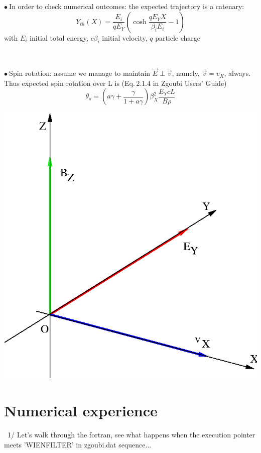 \documentclass[10pt]{article}
\newcommand{\nib}{\noindent \ensuremath{\bullet~}}
\newcommand{\nin}{\noindent~}
\begin{document}
\begin{minipage}{.69\linewidth}
\nib In order to check numerical outcomes: the expected trajectory is a catenary:
%
$$ Y_{th}(X) = \frac{E_i}{qE_Y} \left( \cosh \dfrac{qE_Y X}{\beta_i E_i } -1 \right)$$
with $E_i$  initial total energy, $c\beta_i$ initial velocity, $q$  particle charge

~

\nib Spin rotation: assume we manage to maintain $\vec E \perp \vec v$, namely, $\vec v = v_X$, always. Thus expected spin rotation over L  is (Eq.\,2.1.4 in Zgoubi Users' Guide)
$$ \theta_s = (a\gamma+\dfrac{\gamma}{1+a\gamma})\beta_X^2 \dfrac{E_YcL}{B\rho}  $$

\end{minipage} \hfill
\begin{minipage}{.3\linewidth}
  \includegraphics[width=0.99\linewidth]{wienF.eps}
\end{minipage}


\section*{ Numerical experience }

\nin 1/ Let's  walk through the fortran, see what happens when the execution pointer meets 'WIENFILTER'  in zgoubi.dat sequence...
\end{document}
